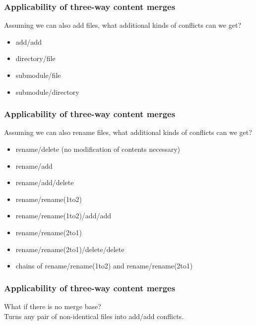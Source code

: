 \documentclass[t]{beamer}
\begin{document}

\begin{frame}
  \frametitle{Applicability of three-way content merges}

  Assuming we can also add files, what additional kinds of conflicts can we get?
  \pause
  \begin{itemize}
    \item add/add
    \pause
    \item directory/file
    \pause
    \item submodule/file
    \pause
    \item submodule/directory
  \end{itemize}

\end{frame}


\begin{frame}
  \frametitle{Applicability of three-way content merges}

  Assuming we can also rename files, what additional kinds of
  conflicts can we get?
  \pause
  \begin{itemize}
    \item rename/delete (no modification of contents necessary)
    \pause
    \item rename/add
    \pause
    \item rename/add/delete
    \pause
    \item rename/rename(1to2)
    \pause
    \item rename/rename(1to2)/add/add
    \pause
    \item rename/rename(2to1)
    \pause
    \item rename/rename(2to1)/delete/delete
    \pause
    \item chains of rename/rename(1to2) and rename/rename(2to1)
  \end{itemize}

\end{frame}


\begin{frame}
  \frametitle{Applicability of three-way content merges}

  What if there is no merge base?
  \pause
  \\[\baselineskip]
  Turns any pair of non-identical files into add/add conflicts.

\end{frame}
\end{document}
